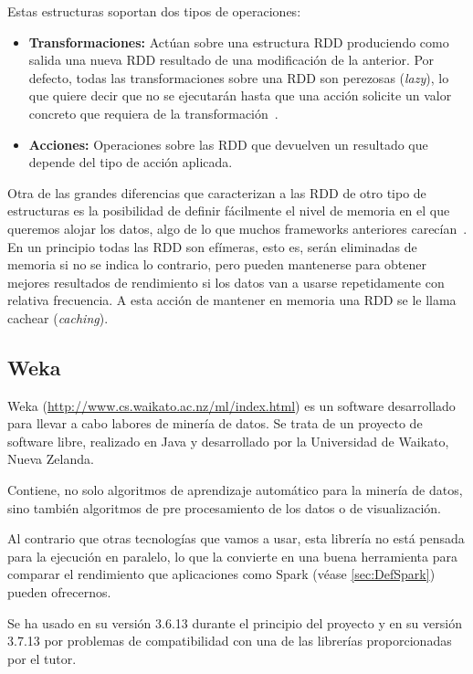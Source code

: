 Estas estructuras soportan dos tipos de operaciones:

\begin{itemize}
	\item \textbf{Transformaciones:} Actúan sobre una estructura RDD produciendo como salida una nueva RDD resultado de una modificación de la anterior. Por defecto, todas las transformaciones sobre una RDD son perezosas (\textit{lazy}), lo que quiere decir que no se ejecutarán hasta que una acción solicite un valor concreto que requiera de la transformación~\cite{SparkPaper}.
	\item \textbf{Acciones:} Operaciones sobre las RDD que devuelven un resultado que depende del tipo de acción aplicada.
\end{itemize}

Otra de las grandes diferencias que caracterizan a las RDD de otro tipo de estructuras es la posibilidad de definir fácilmente el nivel de memoria en el que queremos alojar los datos, algo de lo que muchos frameworks anteriores carecían~\cite{RDDPaper}. En un principio todas las RDD son efímeras, esto es, serán eliminadas de memoria si no se indica lo contrario, pero pueden mantenerse para obtener mejores resultados de rendimiento si los datos van a usarse repetidamente con relativa frecuencia. A esta acción de mantener en memoria una RDD se le llama cachear (\textit{caching}).

\subsection{Weka}\label{sec:DefWeka}
Weka (\url{http://www.cs.waikato.ac.nz/ml/index.html}) es un software desarrollado para llevar a cabo labores de minería de datos. Se trata de un proyecto de software libre, realizado en Java y desarrollado por la Universidad de Waikato, Nueva Zelanda.

Contiene, no solo algoritmos de aprendizaje automático para la minería de datos, sino también algoritmos de pre procesamiento de los datos o de visualización.

Al contrario que otras tecnologías que vamos a usar, esta librería no está pensada para la ejecución en paralelo, lo que la convierte en una buena herramienta para comparar el rendimiento que aplicaciones como Spark (véase \ref{sec:DefSpark}) pueden ofrecernos.

Se ha usado en su versión 3.6.13 durante el principio del proyecto y en su versión 3.7.13 por problemas de compatibilidad con una de las librerías proporcionadas por el tutor.

